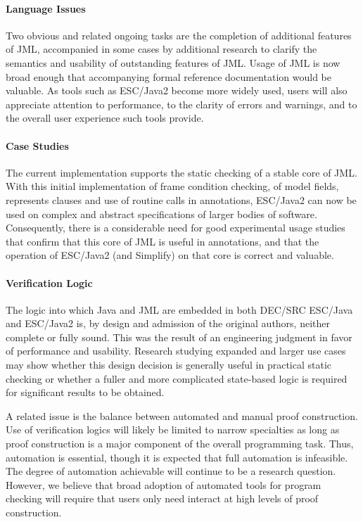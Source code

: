 \documentclass{article}
\begin{document}
\paragraph*{Language Issues} Two obvious and related ongoing tasks are
the completion of additional features of JML, accompanied in some
cases by additional research to clarify the semantics and usability of
outstanding features of JML.  Usage of JML is now broad enough that
accompanying formal reference documentation would be valuable.  As
tools such as ESC/Java2 become more widely used, users will also
appreciate attention to performance, to the clarity of errors and
warnings, and to the overall user experience such tools provide.

\paragraph*{Case Studies} The current implementation supports the
static checking of a stable core of JML.  With this initial
implementation of frame condition checking, of model fields,
represents clauses and use of routine calls in annotations, ESC/Java2
can now be used on complex and abstract specifications of larger
bodies of software.  Consequently, there is a considerable need for
good experimental usage studies that confirm that this core of JML is
useful in annotations, and that the operation of ESC/Java2 (and
Simplify) on that core is correct and valuable.

\paragraph*{Verification Logic} The logic into which Java and JML are
embedded in both DEC/SRC ESC/Java and ESC/Java2 is, 
by design and admission of the original
authors, neither complete or fully sound.  This was the result of an
engineering judgment in favor of performance and usability.  Research
studying expanded and larger use cases may show whether this
design decision is generally useful in practical static checking or
whether a fuller and more complicated state-based logic is required
for significant results to be obtained. 

A related issue is the balance between automated and manual proof construction.
Use of verification logics will likely be limited to narrow specialties as long as proof
construction is a major component of the overall programming task.  Thus, automation
is essential, though it is expected that full automation is infeasible.  The degree of
automation achievable will continue to be a research question. 
However, we believe that broad adoption of automated tools for program checking 
will require that users only need interact at high levels of proof construction.
\end{document}
